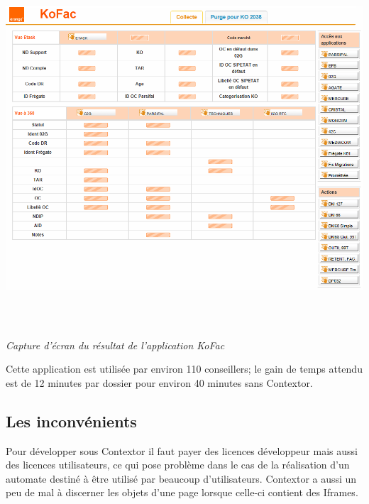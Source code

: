 \documentclass[a4paper,twoside,12pt]{report}
\begin{document}
\begin{center}
\includegraphics[height=14cm]{Res_KoFac.PNG}\\
\itshape Capture d'écran du résultat de l'application KoFac
\end{center}
\vspace{1cm}
Cette application est utilisée par environ 110 conseillers; le gain de temps attendu est de 12 minutes par dossier pour environ 40 minutes sans Contextor.
\subsection{Les inconvénients}
Pour développer sous Contextor il faut payer des licences développeur mais aussi des licences utilisateurs, ce qui pose problème dans le cas de la réalisation d'un automate destiné à être utilisé par beaucoup d'utilisateurs.
Contextor a aussi un peu de mal à discerner les objets d'une page lorsque celle-ci contient des Iframes.
\end{document}
